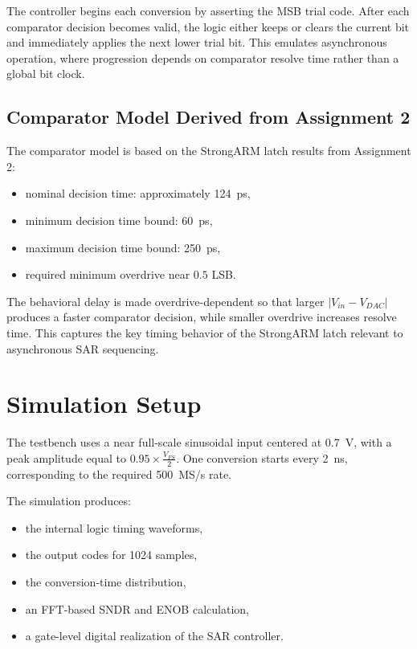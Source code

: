 \documentclass[11pt]{article}
\begin{document}
The controller begins each conversion by asserting the MSB trial code. After each comparator decision becomes valid, the logic either keeps or clears the current bit and immediately applies the next lower trial bit. This emulates asynchronous operation, where progression depends on comparator resolve time rather than a global bit clock.

\subsection{Comparator Model Derived from Assignment 2}
The comparator model is based on the StrongARM latch results from Assignment 2:
\begin{itemize}
    \item nominal decision time: approximately \SI{124}{ps},
    \item minimum decision time bound: \SI{60}{ps},
    \item maximum decision time bound: \SI{250}{ps},
    \item required minimum overdrive near $0.5$ LSB.
\end{itemize}

The behavioral delay is made overdrive-dependent so that larger $|V_{in} - V_{DAC}|$ produces a faster comparator decision, while smaller overdrive increases resolve time. This captures the key timing behavior of the StrongARM latch relevant to asynchronous SAR sequencing.

\section{Simulation Setup}
The testbench uses a near full-scale sinusoidal input centered at \SI{0.7}{V}, with a peak amplitude equal to $0.95 \times \frac{V_{FS}}{2}$. One conversion starts every \SI{2}{ns}, corresponding to the required \SI{500}{MS/s} rate.

The simulation produces:
\begin{itemize}
    \item the internal logic timing waveforms,
    \item the output codes for 1024 samples,
    \item the conversion-time distribution,
    \item an FFT-based SNDR and ENOB calculation,
    \item a gate-level digital realization of the SAR controller.
\end{itemize}
\end{document}

